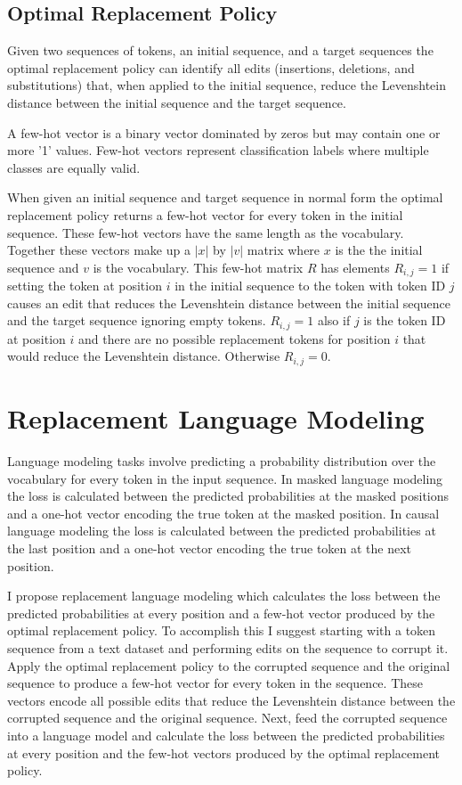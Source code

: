 \documentclass{article}
\begin{document}
\subsection{Optimal Replacement Policy}
Given two sequences of tokens, an initial sequence, and a target sequences the optimal replacement policy can identify all edits (insertions, deletions, and substitutions) that, when applied to the initial sequence, reduce the Levenshtein distance between the initial sequence and the target sequence.

A few-hot vector is a binary vector dominated by zeros but may contain one or more '1' values. Few-hot vectors represent classification labels where multiple classes are equally valid.

When given an initial sequence and target sequence in normal form the optimal replacement policy returns a few-hot vector for every token in the initial sequence. These few-hot vectors have the same length as the vocabulary. Together these vectors make up a $|x|$ by $|v|$ matrix where $x$ is the the initial sequence and $v$ is the vocabulary. This few-hot matrix $R$ has elements $R_{i,j} = 1$ if setting the token at position $i$ in the initial sequence to the token with token ID $j$ causes an edit that reduces the Levenshtein distance between the initial sequence and the target sequence ignoring empty tokens. $R_{i, j} = 1$ also if $j$ is the token ID at position $i$ and there are no possible replacement tokens for position $i$ that would reduce the Levenshtein distance. Otherwise $R_{i,j} = 0$.

\section{Replacement Language Modeling}

Language modeling tasks involve predicting a probability distribution over the vocabulary for every token in the input sequence. In masked language modeling the loss is calculated between the predicted probabilities at the masked positions and a one-hot vector encoding the true token at the masked position. In causal language modeling the loss is calculated between the predicted probabilities at the last position and a one-hot vector encoding the true token at the next position.

I propose replacement language modeling which calculates the loss between the predicted probabilities at every position and a few-hot vector produced by the optimal replacement policy. To accomplish this I suggest starting with a token sequence from a text dataset and performing edits on the sequence to corrupt it. Apply the optimal replacement policy to the corrupted sequence and the original sequence to produce a few-hot vector for every token in the sequence. These vectors encode all possible edits that reduce the Levenshtein distance between the corrupted sequence and the original sequence. Next, feed the corrupted sequence into a language model and calculate the loss between the predicted probabilities at every position and the few-hot vectors produced by the optimal replacement policy.
\end{document}
